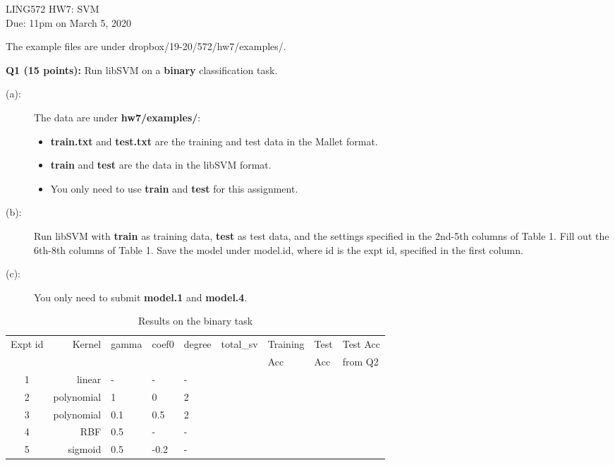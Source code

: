 \documentclass[11pt]{article}
\begin{document}
\begin{center}
\LARGE
LING572 HW7: SVM\\
Due: 11pm on March 5, 2020\\
\vspace{0.3in}
\end{center}

The example files are under dropbox/19-20/572/hw7/examples/.


\vspace{0.4 in}

\noindent
{\bf Q1 (15 points):} Run libSVM on a {\bf binary} classification task.
\begin{description}
 \item [(a):]  The data are under {\bf hw7/examples/}:
    \begin{itemize}
      \item {\bf train.txt} and {\bf test.txt} are the training and 
             test data in the Mallet format.
      \item {\bf train} and {\bf test} are the data in the libSVM format.
      \item You only need to use {\bf train} and {\bf test} for this assignment.
    \end{itemize}

 \item [(b):] Run libSVM with {\bf train} as training data, {\bf test}
              as test data, and the settings specified 
              in the 2nd-5th columns of Table 1. Fill out the 
              6th-8th columns of Table 1. Save the model under 
              model.id, where id is the expt id, specified in the first
              column.
           
 \item [(c):] You only need to submit {\bf model.1} and {\bf model.4}.
              
\end{description}


\begin{table}[h]
\centering
\caption{Results on the binary task}
\label{table1}
\begin{tabular}{|c|r|l|l|l|r|l|l|l|} \hline

Expt id & Kernel  & gamma  &  coef0  & degree & total\_sv & Training & Test & Test Acc\\ 
        &         &        &         &        &           & Acc      & Acc  &  from Q2 \\ \hline
1 & linear      & -   & -    & -  & &  &  & \\ \hline
2 & polynomial  & 1   & 0    & 2  & &  &  & \\ \hline
3 & polynomial  & 0.1 & 0.5  & 2  & &  &  & \\ \hline
4 & RBF         & 0.5 & -    & -  & &  &  & \\ \hline
5 & sigmoid     & 0.5 & -0.2 & -  & &  &  & \\ \hline

\end{tabular}
\end{table}
\end{document}
